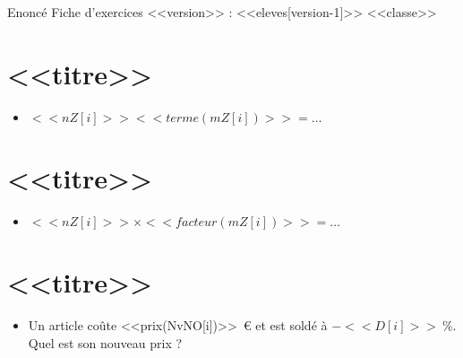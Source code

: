 {Enoncé} \hfill {\huge Fiche d'exercices \no <<version>> : <<eleves[version-1]>>} \hfill {<<classe>>}

\section{<<titre>>}
\begin{itemize}

  \item $<<nZ[i]>> <<terme(mZ[i])>>=\ldots$
\end{itemize}



\section{<<titre>>}
\begin{itemize}

  \item $<<nZ[i]>>\times<<facteur(mZ[i])>>=\ldots$
\end{itemize}


\section{<<titre>>}
\begin{itemize}

  \item Un article coûte <<prix(NvNO[i])>>~€ et est soldé à $-<<D[i]>>~\%$. Quel est son nouveau prix ?
\end{itemize}
